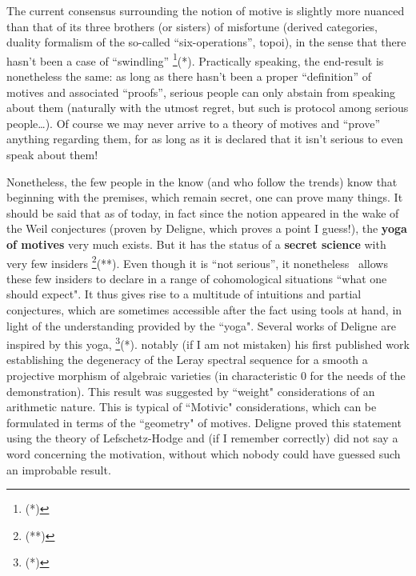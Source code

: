 The current consensus surrounding the notion of motive is slightly more nuanced than 
that of its three brothers (or sisters)
of misfortune (derived categories, duality formalism of the so-called
``six-operations'', topoi), 
in the sense that there hasn't been a case of ``swindling''
\footnote{(*)}(*). 
Practically speaking, the end-result is nonetheless the same: as long as there hasn't been
a proper ``definition'' of motives and associated ``proofs'', serious people can only
abstain from speaking about them
(naturally with the utmost regret, but such is protocol among serious people\ldots).
Of course we may never arrive to a theory of motives and ``prove'' anything regarding them,
for as long as it is declared that it isn't serious to even speak about them! 

Nonetheless, the few people in the know (and who follow the trends)
know that beginning with the premises, which remain secret, one can prove many things. 
It should be said that as of today, 
in fact since the notion appeared in the wake of the Weil conjectures
(proven by Deligne, which proves a point I guess!), the \textbf{yoga of motives} very much
exists. 
But it has the status of a \textbf{secret science} with very few 
insiders
\footnote{(**)}(**).
Even though it is ``not serious'', it nonetheless\
allows these few insiders to declare in a range of cohomological situations 
``what one should expect".
It thus gives rise to a multitude of intuitions and partial conjectures, which are
sometimes accessible after the fact using tools at hand, 
in light of the understanding provided by the ``yoga". 
Several works of Deligne are inspired by this 
yoga, 
\footnote{(*)}(*).
notably (if I am not mistaken) his first published work establishing the degeneracy
of the Leray spectral sequence for a smooth a projective morphism of algebraic
varieties (in characteristic $0$ for the needs of the demonstration).
This result was suggested by ``weight" considerations of an arithmetic nature. 
This is typical of ``Motivic" considerations, which can be formulated in terms of the
``geometry" of motives.
Deligne proved this statement using the theory of Lefschetz-Hodge and (if I remember
correctly) did not say a word concerning the motivation, without which nobody could have
guessed such an improbable result. 

